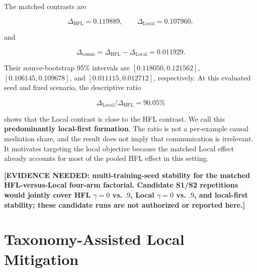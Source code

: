 \documentclass[10pt,twocolumn]{article}
\begin{document}
\begin{table}[t]
\centering
\small
\caption{CLE formation and matched local-first attribution. Source-bootstrap intervals condition on the trained checkpoints.}
\label{tab:auto1}
\end{table}

The matched contrasts are

\[
\Delta_{\mathrm{HFL}}=0.119889,\qquad
\Delta_{\mathrm{Local}}=0.107960,
\]

and

\[
\Delta_{\mathrm{comm}}
=\Delta_{\mathrm{HFL}}-\Delta_{\mathrm{Local}}
=0.011929.
\]

Their source-bootstrap 95\% intervals are \([0.118050,0.121562]\), \([0.106145,0.109678]\), and \([0.011115,0.012712]\), respectively. At this evaluated seed and fixed scenario, the descriptive ratio

\[
\Delta_{\mathrm{Local}}/\Delta_{\mathrm{HFL}}=90.05\%
\]

shows that the Local contrast is close to the HFL contrast. We call this \textbf{predominantly local-first formation}. The ratio is not a per-example causal mediation share, and the result does not imply that communication is irrelevant. It motivates targeting the local objective because the matched Local effect already accounts for most of the pooled HFL effect in this setting.

\textbf{[EVIDENCE NEEDED: multi-training-seed stability for the matched HFL-versus-Local four-arm factorial. Candidate S1/S2 repetitions would jointly cover HFL \(\gamma=0\) vs. \(.9\), Local \(\gamma=0\) vs. \(.9\), and local-first stability; these candidate runs are not authorized or reported here.]}

\section{Taxonomy-Assisted Local Mitigation}
\end{document}
